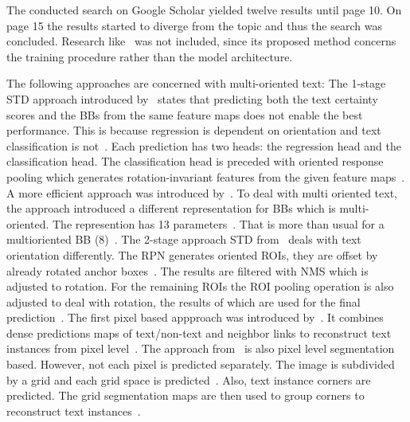 The conducted search on Google Scholar yielded twelve results until page 10.
On page 15 the results started to diverge from the topic and thus the search was concluded.
Research like~\cite{xue_accurate_2018} was not included, since its proposed method concerns the
training procedure rather than the model architecture.

The following approaches are concerned with multi-oriented text:
The 1-stage \ac{STD} approach introduced by~\cite{liao_rotation-sensitive_2018} states that
predicting both the text certainty scores and the \acp{BB} from the same feature maps does not
enable the best performance.
This is because regression is dependent on orientation and text classification is
not~\citep{liao_rotation-sensitive_2018}.
Each prediction has two heads: the regression head and the classification head.
The classification head is preceded with oriented response pooling which generates rotation-invariant
features from the given feature maps~\citep{liao_rotation-sensitive_2018}.
A more efficient approach was introduced by~\citep{liao_textboxes_2018}.
To deal with multi oriented text, the approach introduced a different representation for \acp{BB}
which is multi-oriented.
The represention has 13 parameters~\citep{liao_textboxes_2018}.
That is more than usual for a multioriented \ac{BB} (8)~\citep{ma_arbitrary-oriented_2018}.
The 2-stage approach \ac{STD} from~\cite{ma_arbitrary-oriented_2018} deals with text orientation
differently.
The \ac{RPN} generates oriented \acp{ROI}, they are offset by already rotated anchor
boxes~\citep{ma_arbitrary-oriented_2018}.
The results are filtered with \ac{NMS} which is adjusted to rotation.
For the remaining \acp{ROI} the \ac{ROI} pooling operation is also adjusted to deal with rotation,
the results of which are used for the final prediction~\citep{ma_arbitrary-oriented_2018}.
The first pixel based appproach was introduced by~\cite{deng_pixellink_2018}.
It combines dense predictions maps of text/non-text and neighbor links to reconstruct text instances
from pixel level~\citep{deng_pixellink_2018}.
The approach from~\cite{lyu_multi-oriented_2018} is also pixel level segmentation based.
However, not each pixel is predicted separately.
The image is subdivided by a grid and each grid space is predicted~\citep{lyu_multi-oriented_2018}.
Also, text instance corners are predicted.
The grid segmentation maps are then used to group corners to reconstruct text
instances~\citep{lyu_multi-oriented_2018}.

